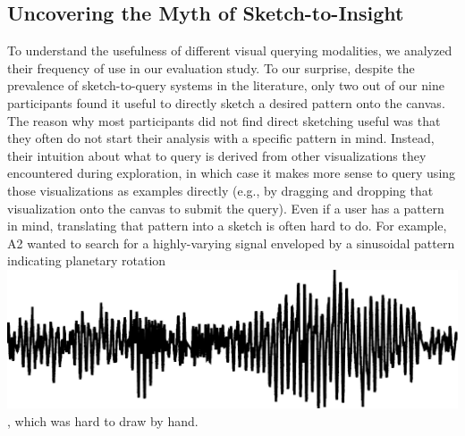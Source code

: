  \subsection{Uncovering the Myth of Sketch-to-Insight}
 \par To understand the usefulness of different visual querying modalities, we analyzed their frequency of use in our evaluation study. To our surprise,
 despite the prevalence of sketch-to-query
 systems in the literature,  only two out of our nine participants
 found it useful to directly
 sketch a desired pattern onto the canvas. %
 The reason why most participants
 did not find direct sketching useful was that
 they often do not start their analysis with a specific pattern in mind.
 Instead, their intuition about what to query is derived
 from other visualizations they encountered
 during exploration, in which case it makes
 more sense to query using those visualizations
 as examples directly (e.g., by dragging and dropping
 that visualization onto the canvas to submit the query).
 Even if a user has a pattern in mind,
 translating that pattern into a sketch is often hard
 to do. For example,
 A2 wanted to search for a highly-varying signal
 enveloped by a sinusoidal pattern indicating
 planetary rotation \includegraphics[width=3\baselineskip,keepaspectratio]{figures/impossible_sketch.png}, which was hard to draw by hand.
